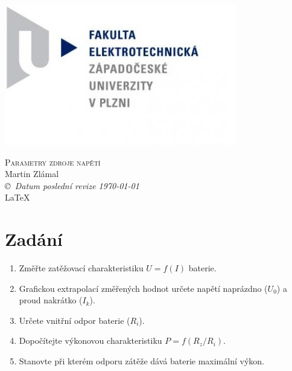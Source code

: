 \documentclass[12pt]{article} %
\newcommand{\bigsize}{\fontsize{35pt}{20pt}\selectfont}
\begin{document}
\begin{titlepage}
	\includegraphics[scale=0.7]{logo.jpg}
	\vspace*{\fill}
	\begin{center}
		\textsc{\LARGE \bigsize Parametry zdroje napětí}\\[1cm]
		Martin Zlámal \\[1cm]
		{\small\em \copyright \ Datum poslední revize \today } \\
		\LaTeX
	\end{center}
	\vspace*{\fill}
\end{titlepage}
\tableofcontents
\listoffigures
\listoftables
\newpage

\section{Zadání}
\begin{enumerate}
\item Změřte zatěžovací charakteristiku $U=f(I)$ baterie.
\item Grafickou extrapolací změřených hodnot určete napětí naprázdno ($U_0$) a proud nakrátko ($I_k$).
\item Určete vnitřní odpor baterie ($R_i$).
\item Dopočítejte výkonovou charakteristiku $P=f(R_z/R_i)$.
\item Stanovte při kterém odporu zátěže dává baterie maximální výkon.
\end{enumerate}
\end{document}
